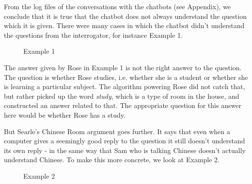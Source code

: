 From the log files of the conversations with the chatbots (see Appendix), we conclude that it is true that the chatbot does not always understand the question which it is given. There were many cases in which the chatbot didn't understand the questions from the interrogator, for instance Example 1.

\begin{figure}[ht]
   \begin{center}
   \end{center}
   \caption{Example 1}
\end{figure}

The answer given by Rose in Example 1 is not the right answer to the question. The question is whether Rose studies, i.e. whether she is a student or whether she is learning a particular subject. The algorithm powering Rose did not catch that, but rather picked up the word \textit{study}, which is a type of room in the house, and constructed an answer related to that. The appropriate question for this answer here would be whether Rose has a study.

But Searle's Chinese Room argument goes further. It says that even when a computer gives a seemingly good reply to the question it still doesn't understand its own reply - in the same way that Sam who is talking Chinese doesn't actually understand Chinese. To make this more concrete, we look at Example 2.

\begin{figure}[ht]
   \begin{center}
   \end{center}
   \caption{Example 2}
\end{figure}

